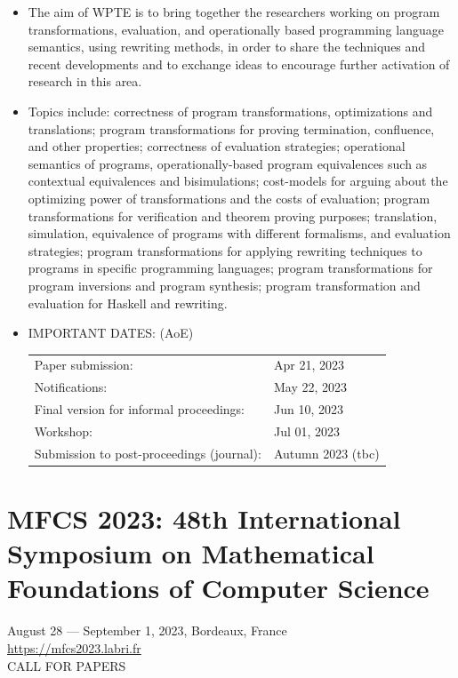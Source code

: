 \documentclass[prodmode,acmtecs]{acmsmall} %
\begin{document}
\begin{itemize}\item  The aim of WPTE is to bring together the researchers working on program transformations, evaluation, and operationally based programming language semantics, using rewriting methods, in order to share the techniques and recent developments and to exchange ideas to encourage further activation of research in this area. 
 
\item  Topics include: correctness of program transformations, optimizations and translations; program transformations for proving termination, confluence, and other properties; correctness of evaluation strategies; operational semantics of programs, operationally-based program equivalences such as contextual equivalences and bisimulations; cost-models for arguing about the optimizing power of transformations and the costs of evaluation; program transformations for verification and theorem proving purposes; translation, simulation, equivalence of programs with different formalisms, and evaluation strategies; program transformations for applying rewriting techniques to programs in specific programming languages; program transformations for program inversions and program synthesis; program transformation and evaluation for Haskell and rewriting. 
 
\item  IMPORTANT DATES: (AoE) 
 
\begin{tabulary}{\linewidth}{LL}Paper submission:  & Apr 21, 2023 \\
Notifications:  & May 22, 2023 \\
Final version for informal proceedings:  & Jun 10, 2023 \\
Workshop:  & Jul 01, 2023 \\
Submission to post-proceedings (journal):  & Autumn 2023 (tbc) \\
\end{tabulary}
 
\end{itemize}\section{MFCS 2023: 48th International Symposium on Mathematical Foundations of Computer Science}\label{MFCS2023}  August 28 — September 1, 2023, Bordeaux, France\\ 
  \href{https://mfcs2023.labri.fr}{https://mfcs2023.labri.fr}\\ 
CALL FOR PAPERS 
\end{document}
